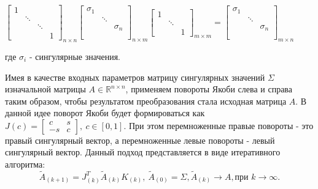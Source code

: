 \begin{center}
    $\begin{bmatrix}
        1 & & & \\
         & \ddots & & \\
         & & \ddots & \\
         & & & 1
    \end{bmatrix}_{n \times n}
    \begin{bmatrix}
        \sigma_1 & & \\
         & \ddots & \\
         & & \sigma_n \\
         & & \\
         & & 
    \end{bmatrix}_{n \times m}
    \begin{bmatrix}
        1 & & \\
         & \ddots & \\
         & & 1
    \end{bmatrix}_{m \times m}
    =
    \begin{bmatrix}
        \sigma_1 & & \\
         & \ddots & \\
         & & \sigma_n \\
         & & \\
         & & 
    \end{bmatrix}_{m \times n}$
    
    \vspace{1em} 
    где $\sigma_i$ - сингулярные значения.
\end{center}

Имея в качестве входных параметров матрицу сингулярных значений $\Sigma$ изначальной матрицы $A\in \mathbb{R}^{n\times n}$, применяем повороты Якоби слева и справа таким образом, чтобы результатом преобразования стала исходная матрица $A$. В данной идее поворот Якоби будет формироваться как $J(c) = \begin{bmatrix}
    c&s\\-s&c
\end{bmatrix},\ c\in[0,1]$. При этом перемноженные правые повороты - это правый сингулярный вектор, а перемноженные левые повороты - левый сингулярный вектор. Данный подход представляется в виде итеративного алгоритма:
\begin{equation}
    \tilde{A}_{(k+1)}=J^T_{(k)}\tilde{A}_{(k)}K_{(k)},\ \tilde{A}_{(0)} = \Sigma, \tilde{A}_{(k)} \longrightarrow A, \text{при }k \to \infty.
\end{equation}

